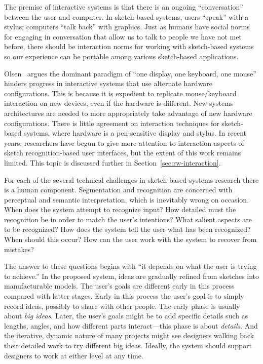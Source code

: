 \documentclass[11pt]{article}
\begin{document}
The premise of interactive systems is that there is an ongoing
``conversation'' between the user and computer. In sketch-based
systems, users ``speak'' with a stylus; computers ``talk back'' with
graphics. Just as humans have social norms for engaging in
conversation that allow us to talk to people we have not met before,
there should be interaction norms for working with sketch-based
systems so our experience can be portable among various sketch-based
applications.

Olsen~\cite{olsen-ui-research} argues the dominant paradigm of ``one
display, one keyboard, one mouse'' hinders progress in interactive
systems that use alternate hardware configurations. This is because it
is expedient to replicate mouse/keyboard interaction on new devices,
even if the hardware is different. New systems architectures are
needed to more appropriately take advantage of new hardware
configurations. There is little agreement on interaction techniques
for sketch-based systems, where hardware is a pen-sensitive display
and stylus. In recent years, researchers have begun to give more
attention to interaction aspects of sketch recognition-based user
interfaces, but the extent of this work remains limited. This topic is
discussed further in Section~\ref{sec:rw-interaction}.

For each of the several technical challenges in sketch-based systems
research there is a human component. Segmentation and recognition are
concerned with perceptual and semantic interpretation, which is
inevitably wrong on occasion. When does the system attempt to
recognize input? How detailed must the recognition be in order to
match the user's intentions? What salient aspects are to be
recognized? How does the system tell the user what has been
recognized? When should this occur? How can the user work with the
system to recover from mistakes?

The answer to these questions begins with ``it depends on what the
user is trying to achieve.'' In the proposed system, ideas are
gradually refined from sketches into manufacturable models. The user's
goals are different early in this process compared with latter
stages. Early in this process the user's goal is to simply record
ideas, possibly to share with other people. The early phase is usually
about \textit{big ideas}. Later, the user's goals might be to add
specific details such as lengths, angles, and how different parts
interact---this phase is about \textit{details}. And the iterative,
dynamic nature of many projects might see designers walking back their
detailed work to try different big ideas. Ideally, the system should
support designers to work at either level at any time.
\end{document}
